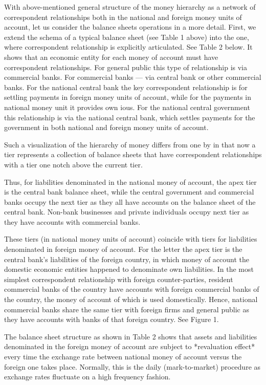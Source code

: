 With above-mentioned general structure of the money hierarchy as a
network of correspondent relationships both in the national and foreign
money units of account, let us consider the balance sheets operations in
a more detail. First, we extend the schema of a typical balance sheet
(see Table 1 above) into the one, where correspondent relationship is
explicitly articulated. See Table 2 below. It shows that an economic
entity for each money of account must have correspondent
relationships. For general public this type of relationship is via
commercial banks. For commercial banks --- via central bank or other
commercial banks. For the national central bank the key correspondent
relationship is for settling payments in foreign money units of account,
while for the payments in national money unit it provides own \acp{iou}. For
the national central government this relationship is via the national
central bank, which settles payments for the government in both national
and foreign money units of account.

Such a visualization of the hierarchy of money differs from one by \citep{bell,wray2012,wray2020} in that now a tier represents a collection
of balance sheets that have correspondent relationships with a tier one
notch above the current tier.

Thus, for liabilities denominated in the national money of account,
the apex tier is the central bank balance sheet, while the central
government and commercial banks occupy the next tier as they all have
accounts on the balance sheet of the central bank. Non-bank businesses
and private individuals occupy next tier as they have accounts with
commercial banks.

These tiers (in national money units of account) coincide with tiers for
liabilities denominated in foreign money of account. For the letter
the apex tier is the central bank's liabilities of the foreign country,
in which money of account the domestic economic entities happened
to denominate own liabilities. In the most simplest correspondent
relationship with foreign counter-parties, resident commercial banks of
the country have accounts with foreign commercial banks of the country,
the money of account of which is used domestically. Hence, national
commercial banks share the same tier with foreign firms and general
public as they have accounts with banks of that foreign country. See
Figure 1.

The balance sheet structure as shown in Table 2 shows that assets and
liabilities denominated in the foreign money of account are subject
to *revaluation effect* every time the exchange rate between national
money of account versus the foreign one takes place. Normally, this
is the daily (mark-to-market) procedure as exchange rates fluctuate on a
high frequency fashion.

